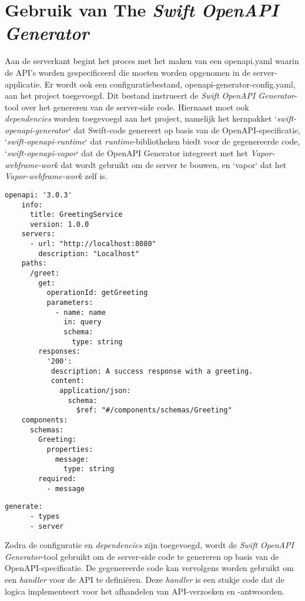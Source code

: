 \section{Gebruik van The \textit{Swift OpenAPI Generator}}

Aan de serverkant begint het proces met het maken van een openapi.yaml waarin de API's worden gespecificeerd die moeten worden opgenomen in de server-\\applicatie. Er wordt ook een configuratiebestand, openapi-generator-config.yaml, aan het project toegevoegd. Dit bestand instrueert de \textit{Swift OpenAPI Generator}-tool over het genereren van de server-side code. Hiernaast moet ook \\\textit{dependencies} worden toegevoegd aan het project, namelijk het kernpakket `\textit{swift-openapi-generator}` dat Swift-code genereert op basis van de OpenAPI-specificatie, `\textit{swift-openapi-runtime}` dat \textit{runtime}-bibliotheken biedt voor de gegenereerde code, `\textit{swift-openapi-vapor}` dat de OpenAPI Generator integreert met het \textit{Vapor-webframe-work} dat wordt gebruikt om de server te bouwen, en `vapor` dat het \textit{Vapor-webframe-work} zelf is.

\begin{lstlisting}[caption=openapi.yml file]
    openapi: '3.0.3'
    info:
      title: GreetingService
      version: 1.0.0
    servers:
      - url: "http://localhost:8080"
        description: "Localhost"
    paths:
      /greet:
        get:
          operationId: getGreeting
          parameters:
            - name: name
              in: query
              schema:
                type: string
        responses:
          '200':
           description: A success response with a greeting.
           content:
             application/json:
               schema:
                 $ref: "#/components/schemas/Greeting"
    components:
      schemas:
        Greeting:
          properties:
            message:
              type: string
        required:
          - message
\end{lstlisting}

\begin{lstlisting}[caption=openapi-generator-config.yaml server file]
    generate:
      - types
      - server
\end{lstlisting}

Zodra de configuratie en \textit{dependencies} zijn toegevoegd, wordt de \textit{Swift OpenAPI Generator}-tool gebruikt om de server-side code te genereren op basis van de \\OpenAPI-specificatie. De gegenereerde code kan vervolgens worden gebruikt om een \textit{handler} voor de API te definiëren. Deze \textit{handler} is een stukje code dat de logica implementeert voor het afhandelen van API-verzoeken en -antwoorden. 

